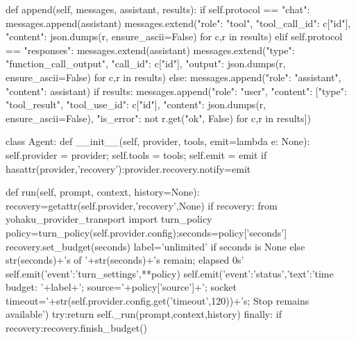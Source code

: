     def append(self, messages, assistant, results):
        if self.protocol == "chat":
            messages.append(assistant)
            messages.extend({"role": "tool", "tool_call_id": c["id"], "content": json.dumps(r, ensure_ascii=False)} for c,r in results)
        elif self.protocol == "responses":
            messages.extend(assistant)
            messages.extend({"type": "function_call_output", "call_id": c["id"], "output": json.dumps(r, ensure_ascii=False)} for c,r in results)
        else:
            messages.append({"role": "assistant", "content": assistant})
            if results:
                messages.append({"role": "user", "content": [{"type": "tool_result", "tool_use_id": c["id"],
                    "content": json.dumps(r, ensure_ascii=False), "is_error": not r.get("ok", False)} for c,r in results]})

class Agent:
    def __init__(self, provider, tools, emit=lambda e: None):
        self.provider = provider; self.tools = tools; self.emit = emit
        if hasattr(provider,'recovery'):provider.recovery.notify=emit

    def run(self, prompt, context, history=None):
        recovery=getattr(self.provider,'recovery',None)
        if recovery:
            from yohaku_provider_transport import turn_policy
            policy=turn_policy(self.provider.config);seconds=policy['seconds']
            recovery.set_budget(seconds)
            label='unlimited' if seconds is None else str(seconds)+'s of '+str(seconds)+'s remain; elapsed 0s'
            self.emit({'event':'turn_settings',**policy})
            self.emit({'event':'status','text':'time budget: '+label+'; source='+policy['source']+'; socket timeout='+str(self.provider.config.get('timeout',120))+'s; Stop remains available'})
        try:return self._run(prompt,context,history)
        finally:
            if recovery:recovery.finish_budget()


